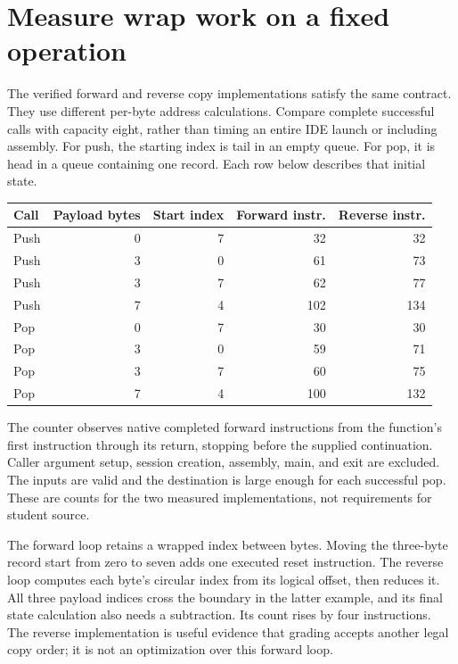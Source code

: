 \section{Measure wrap work on a fixed operation}\label{ring-measurement}
The verified forward and reverse copy implementations satisfy the same contract.
They use different per-byte address calculations. Compare complete successful calls
with capacity eight, rather than timing an entire IDE launch or including assembly.
For push, the starting index is tail in an empty queue. For pop, it is head in a
queue containing one record. Each row below describes that initial state.

\begin{longtable}{lrrrr}
  \toprule Call & Payload bytes & Start index & Forward instr. & Reverse instr. \\\midrule
  Push          & 0             & 7           & 32             & 32             \\
  Push          & 3             & 0           & 61             & 73             \\
  Push          & 3             & 7           & 62             & 77             \\
  Push          & 7             & 4           & 102            & 134            \\
  Pop           & 0             & 7           & 30             & 30             \\
  Pop           & 3             & 0           & 59             & 71             \\
  Pop           & 3             & 7           & 60             & 75             \\
  Pop           & 7             & 4           & 100            & 132            \\\bottomrule
\end{longtable}
The counter observes native completed forward instructions from the function's first
instruction through its return, stopping before the supplied continuation. Caller
argument setup, session creation, assembly, main, and exit are excluded. The inputs
are valid and the destination is large enough for each successful pop. These are
counts for the two measured implementations, not requirements for student source.

The forward loop retains a wrapped index between bytes. Moving the three-byte
record start from zero to seven adds one executed reset instruction. The reverse
loop computes each byte's circular index from its logical offset, then reduces it.
All three payload indices cross the boundary in the latter example, and its final
state calculation also needs a subtraction. Its count rises by four instructions.
The reverse implementation is useful evidence that grading accepts another legal
copy order; it is not an optimization over this forward loop.

